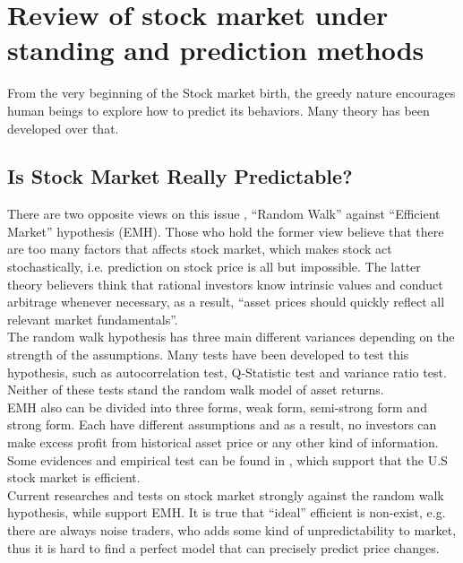 \section{Review of stock market under standing and prediction methods}
\label{sec:mark_prediction}
From the very beginning of the Stock market birth, the greedy nature encourages human beings to explore how to predict its behaviors. Many theory has been developed over that.

\subsection{Is Stock Market Really Predictable?}
There are two opposite views on this issue \cite{2_dalton_2001}, “Random Walk” against “Efficient Market” hypothesis (EMH). Those who hold the former view believe that there are too many factors that affects stock market, which makes stock act stochastically, i.e. prediction on stock price is all but impossible. The latter theory believers think that rational investors know intrinsic values and conduct arbitrage whenever necessary, as a result, “asset prices should quickly reflect all relevant market fundamentals”\cite{1_wong_1997}.\\

The random walk hypothesis has three main different variances depending on the strength of the assumptions\cite{1_shadbolttaylor_2002}. Many tests have been developed to test this hypothesis, such as autocorrelation test\cite{lo1988stock}, Q-Statistic test\cite{box1970distribution} and variance ratio test\cite{1_shadbolttaylor_2002}. Neither of these tests stand the random walk model of asset returns.\\

EMH also can be divided into three forms\cite{1_wong_1997}, weak form, semi-strong form and strong form. Each have different assumptions and as a result, no investors can make excess profit from historical asset price or any other kind of information. Some evidences and empirical test can be found in \cite{1_keane_1983}, which support that the U.S stock market is efficient.\\

Current researches and tests on stock market strongly against the random walk hypothesis, while support EMH. It is true that “ideal” efficient is non-exist, e.g. there are always noise traders\cite{de1990noise}, who adds some kind of unpredictability to market, thus it is hard to find a perfect model that can precisely predict price changes.

